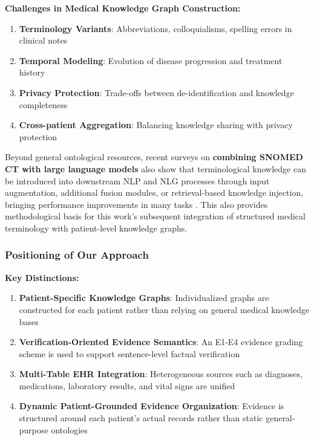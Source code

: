 \documentclass[11pt]{article}
\begin{document}
\textbf{Challenges in Medical Knowledge Graph Construction:}

\begin{enumerate}
\def\labelenumi{\arabic{enumi}.}
\item
  \textbf{Terminology Variants}: Abbreviations, colloquialisms, spelling errors in clinical notes
\item
  \textbf{Temporal Modeling}: Evolution of disease progression and treatment history
\item
  \textbf{Privacy Protection}: Trade-offs between de-identification and knowledge completeness
\item
  \textbf{Cross-patient Aggregation}: Balancing knowledge sharing with privacy protection
\end{enumerate}

Beyond general ontological resources, recent surveys on \textbf{combining SNOMED CT with large language models} also show that terminological knowledge can be introduced into downstream NLP and NLG processes through input augmentation, additional fusion modules, or retrieval-based knowledge injection, bringing performance improvements in many tasks \citep{chang2024snomedCtLLM}. This also provides methodological basis for this work's subsequent integration of structured medical terminology with patient-level knowledge graphs.

\subsubsection{Positioning of Our Approach}

\textbf{Key Distinctions:}

\begin{enumerate}
\def\labelenumi{\arabic{enumi}.}
\item
  \textbf{Patient-Specific Knowledge Graphs}: Individualized graphs are constructed for each patient rather than relying on general medical knowledge bases
\item
  \textbf{Verification-Oriented Evidence Semantics}: An E1-E4 evidence grading scheme is used to support sentence-level factual verification
\item
  \textbf{Multi-Table EHR Integration}: Heterogeneous sources such as diagnoses, medications, laboratory results, and vital signs are unified
\item
  \textbf{Dynamic Patient-Grounded Evidence Organization}: Evidence is structured around each patient's actual records rather than static general-purpose ontologies
\end{enumerate}
\end{document}
